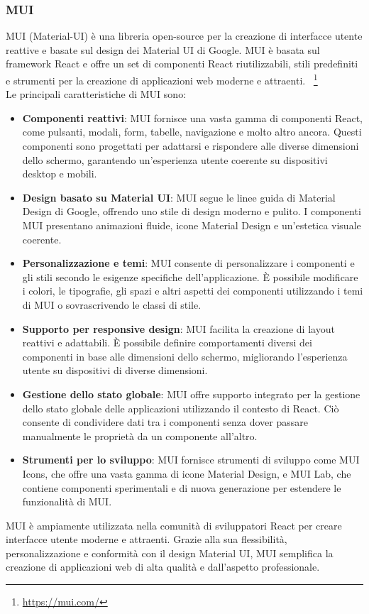 \subsubsection{MUI}
MUI (Material-UI) è una libreria open-source per la creazione di interfacce utente reattive e basate sul design dei Material UI di Google. MUI è basata sul framework React e offre un set di componenti React riutilizzabili, stili predefiniti e strumenti per la creazione di applicazioni web moderne e attraenti. ~\footnote{\url{https://mui.com/}}\\
Le principali caratteristiche di MUI sono:
\begin{itemize}
    \item \textbf{Componenti reattivi}: MUI fornisce una vasta gamma di componenti React, come pulsanti, modali, form, tabelle, navigazione e molto altro ancora. Questi componenti sono progettati per adattarsi e rispondere alle diverse dimensioni dello schermo, garantendo un'esperienza utente coerente su dispositivi desktop e mobili.
    \item \textbf{Design basato su Material UI}: MUI segue le linee guida di Material Design di Google, offrendo uno stile di design moderno e pulito. I componenti MUI presentano animazioni fluide, icone Material Design e un'estetica visuale coerente.
    \item \textbf{Personalizzazione e temi}: MUI consente di personalizzare i componenti e gli stili secondo le esigenze specifiche dell'applicazione. È possibile modificare i colori, le tipografie, gli spazi e altri aspetti dei componenti utilizzando i temi di MUI o sovrascrivendo le classi di stile.
    \item \textbf{Supporto per responsive design}: MUI facilita la creazione di layout reattivi e adattabili. È possibile definire comportamenti diversi dei componenti in base alle dimensioni dello schermo, migliorando l'esperienza utente su dispositivi di diverse dimensioni.
    \item \textbf{Gestione dello stato globale}: MUI offre supporto integrato per la gestione dello stato globale delle applicazioni utilizzando il contesto di React. Ciò consente di condividere dati tra i componenti senza dover passare manualmente le proprietà da un componente all'altro.
    \item \textbf{Strumenti per lo sviluppo}: MUI fornisce strumenti di sviluppo come MUI Icons, che offre una vasta gamma di icone Material Design, e MUI Lab, che contiene componenti sperimentali e di nuova generazione per estendere le funzionalità di MUI.
    \end{itemize}
    MUI è ampiamente utilizzata nella comunità di sviluppatori React per creare interfacce utente moderne e attraenti. Grazie alla sua flessibilità, personalizzazione e conformità con il design Material UI, MUI semplifica la creazione di applicazioni web di alta qualità e dall'aspetto professionale.
